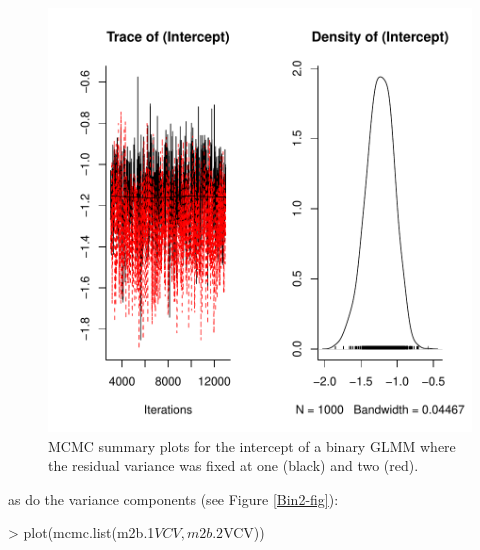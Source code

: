 \documentclass{article}
\begin{document}
\begin{figure}[!h]
\begin{center}
\includegraphics{Lecture2-063}
\end{center}
\caption{MCMC summary plots for the intercept of a binary GLMM where the residual variance was fixed at one (black) and two (red).}
\label{Bin1-fig}
\end{figure}

as do the variance components  (see Figure \ref{Bin2-fig}):

\begin{Schunk}
\begin{Sinput}
> plot(mcmc.list(m2b.1$VCV, m2b.2$VCV))
\end{Sinput}
\end{Schunk}
\end{document}
